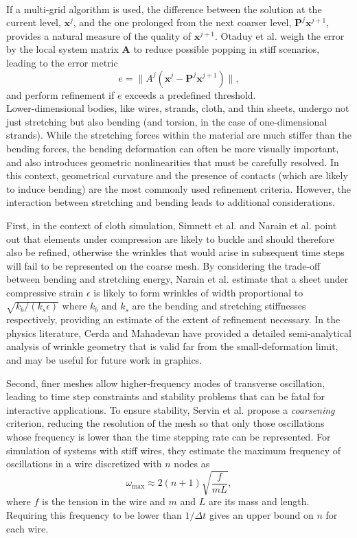 \\
If a multi-grid algorithm is used, the difference between the solution at the current level, $\mathbf x^j$, and the one prolonged from the next coarser level, $\mathbf P^j\mathbf x^{j+1}$, provides a natural measure of the quality of $\mathbf x^{j+1}$.
Otaduy et al. \cite{Otaduy2007} weigh the error by the local system matrix $\mathbf A$ to reduce possible popping in stiff scenarios, leading to the error metric
\begin{equation}
	e = \|A^j(\mathbf x^j-\mathbf P^j\mathbf x^{j+1})\|,
\end{equation}
and perform refinement if $e$ exceeds a predefined threshold.
\\
Lower-dimensional bodies, like wires, strands, cloth, and thin sheets, undergo not just stretching but also bending (and torsion, in the case of one-dimensional strands).
While the stretching forces within the material are much stiffer than the bending forces, the bending deformation can often be more visually important, and also introduces geometric nonlinearities that must be carefully resolved.
In this context, geometrical curvature and the presence of contacts (which are likely to induce bending) are the most commonly used refinement criteria.
However, the interaction between stretching and bending leads to additional considerations.


First, in the context of cloth simulation, Simnett et al. \cite{Simnett2009} and Narain et al. \cite{Narain2012} point out that elements under compression are likely to buckle and should therefore also be refined, otherwise the wrinkles that would arise in subsequent time steps will fail to be represented on the coarse mesh.
By considering the trade-off between bending and stretching energy, Narain et al. estimate that a sheet under compressive strain $\epsilon$ is likely to form wrinkles of width proportional to $\sqrt{k_b/(k_s\epsilon)}$ where $k_b$ and $k_s$ are the bending and stretching stiffnesses respectively, providing an estimate of the extent of refinement necessary.
In the physics literature, Cerda and Mahadevan \cite{Cerda2003} have provided a detailed semi-analytical analysis of wrinkle geometry that is valid far from the small-deformation limit, and may be useful for future work in graphics.

Second, finer meshes allow higher-frequency modes of transverse oscillation, leading to time step constraints and stability problems that can be fatal for interactive applications.
To ensure stability, Servin et al. \cite{Servin2008} propose a \emph{coarsening} criterion, reducing the resolution of the mesh so that only those oscillations whose frequency is lower than the time stepping rate can be represented.
For simulation of systems with stiff wires, they estimate the maximum frequency of oscillations in a wire discretized with $n$ nodes as
\begin{equation}
	\omega_{\max} \approx 2(n+1)\sqrt{\frac{f}{mL}},
\end{equation}
where $f$ is the tension in the wire and $m$ and $L$ are its mass and length.
Requiring this frequency to be lower than $1/\Delta t$ gives an upper bound on $n$ for each wire.

